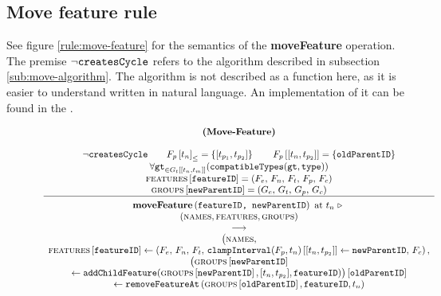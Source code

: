 \subsection{Move feature rule}
\label{sub:move-feature-rule}
See figure \vref{rule:move-feature} for the semantics of the \textbf{moveFeature} operation. The premise $\neg \texttt{createsCycle}$ refers to the algorithm described in subsection \vref{sub:move-algorithm}. The algorithm is not described as a function here, as it is easier to understand written in natural language. An implementation of it can be found in the .

\begin{figure}[h]
    \renewcommand{\arraystretch}{1.1}
    \sossize$$\begin{array}{c}
      \ntyperule{Move-Feature}
      {\\
        \neg \var{createsCycle} \qquad
        \containing{F_p}{t_n} = \set{\interval{t_{p_1}}{t_{p_2}}} \qquad
        \lookup{F_p}{\interval{t_n}{t_{p_2}}} = \set{\var{oldParentID}} \\
        \forall \var{gt}_{\in \lookup{G_t}{\interval{t_n}{t_m}}} (\var{compatibleTypes}(\var{gt}, \var{type})) \\
        \lookup{\features{}}{\var{featureID}} = \feature \\
        \lookup{\groups{}}{\var{newParentID}} = \group
      }
      {
        \textbf{moveFeature}\left( \var{featureID, newParentID}\right) \text{ at } t_n \shove \\
        (\names{}, \features{}, \groups{}) \\
        \transition \\
        \big(\names,\\
        \lookup{\features{}}{\var{featureID}} \assign \left( F_e,\, F_n,\, F_t,\, 
        \lookup{\var{clampInterval}(F_p, t_n)}{\interval{t_n}{t_{p_2}}} \assign \var{newParentID},\, F_c \right), \\
        \lookup{\big(\lookup{\groups{}}{\var{newParentID}} \\
        \assign \var{addChildFeature}(\lookup{\groups{}}{\var{newParentID}}, \interval{t_n}{t_{p_2}}, \var{featureID})\big)}{\var{oldParentID}} \\
        \assign 
      \var{removeFeatureAt}\left(\lookup{\groups{}}{\var{oldParentID}}, \var{featureID}, t_n\right)}
    \end{array}$$
  \caption{\label{rule:move-feature}}
\end{figure}

